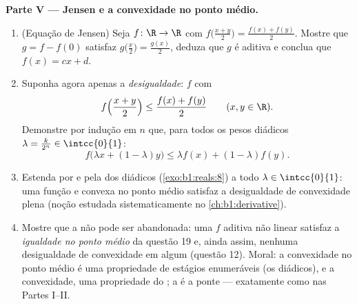 \begin{problem}[{Problema de fim de semana --- $f(x + y) = f(x) + f(y)$:
a regularidade força a linearidade, e o retrato dos monstros}]
\medskip
\noindent\textbf{Parte V --- Jensen e a convexidade no ponto médio.}
\begin{enumerate}
  \item (Equação de Jensen) Seja $f \colon \R \to \R$ 
        com $f\bigl(\frac{x+y}{2}\bigr) = \frac{f(x)
        + f(y)}{2}$. Mostre que $g = f - f(0)$ satisfaz
        $g\bigl(\frac x2\bigr) = \frac{g(x)}{2}$, deduza que
        $g$ é aditiva e conclua que $f(x) = cx + d$.
  \item Suponha agora apenas a \emph{desigualdade}: $f$ 
        com
        \[
        f\Bigl(\frac{x + y}{2}\Bigr) \leq \frac{f(x) +
        f(y)}{2} \qquad (x, y \in \R).
        \]
        Demonstre por indução em $n$ que, para todos os pesos diádicos
        $\lambda = \frac{k}{2^n} \in \intcc{0}{1}$:
        \[
        f\bigl(\lambda x + (1 - \lambda)y\bigr) \leq \lambda
        f(x) + (1 - \lambda) f(y) .
        \]
  \item Estenda por  e pela  dos diádicos
        (\cref{exo:b1:reals:8}) a todo $\lambda \in
        \intcc{0}{1}$: uma função  e convexa no ponto médio
        satisfaz a desigualdade de convexidade plena (noção
        estudada sistematicamente no \cref{ch:b1:derivative}).
  \item Mostre que a  não pode ser abandonada: uma $f$
        aditiva não linear satisfaz a \emph{igualdade no ponto médio}
        da questão 19 e, ainda assim, nenhuma desigualdade de
        convexidade em  algum (questão 12). Moral: a
        convexidade no ponto médio é uma propriedade de estágios
        enumeráveis (os diádicos), e a convexidade, uma propriedade do
        ; a  é a ponte --- exatamente como nas
        Partes I--II.
\end{enumerate}


\end{problem}
